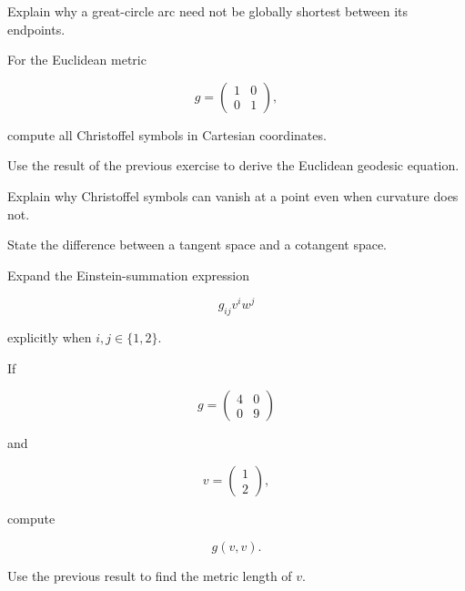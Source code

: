 \begin{exercise}[3]
Explain why a great-circle arc need not be globally shortest between its
endpoints.
\end{exercise}

\begin{exercise}[2]
For the Euclidean metric

\[
g=
\begin{pmatrix}
1&0\\
0&1
\end{pmatrix},
\]

compute all Christoffel symbols in Cartesian coordinates.
\end{exercise}

\begin{exercise}[3]
Use the result of the previous exercise to derive the Euclidean geodesic
equation.
\end{exercise}

\begin{exercise}[2]
Explain why Christoffel symbols can vanish at a point even when curvature
does not.
\end{exercise}

\begin{exercise}[2]
State the difference between a tangent space and a cotangent space.
\end{exercise}

\begin{exercise}[2]
Expand the Einstein-summation expression

\[
g_{ij}v^iw^j
\]

explicitly when \(i,j\in\{1,2\}\).
\end{exercise}

\begin{exercise}[2]
If

\[
g=
\begin{pmatrix}
4&0\\
0&9
\end{pmatrix}
\]

and

\[
v=
\begin{pmatrix}
1\\2
\end{pmatrix},
\]

compute

\[
g(v,v).
\]
\end{exercise}

\begin{exercise}[2]
Use the previous result to find the metric length of \(v\).
\end{exercise}

